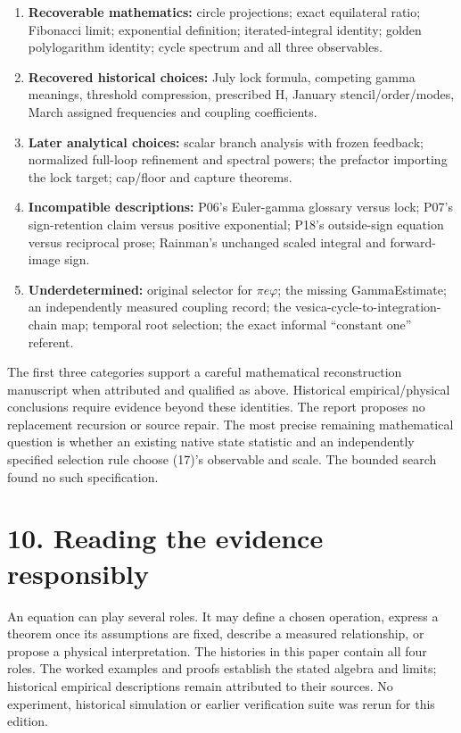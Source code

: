\documentclass[11pt,a4paper]{article}
\begin{document}
\begin{enumerate}
\item \textbf{Recoverable mathematics:} circle projections; exact equilateral ratio; Fibonacci limit; exponential definition; iterated-integral identity; golden polylogarithm identity; cycle spectrum and all three observables.
\item \textbf{Recovered historical choices:} July lock formula, competing gamma meanings, threshold compression, prescribed H, January stencil/order/modes, March assigned frequencies and coupling coefficients.
\item \textbf{Later analytical choices:} scalar branch analysis with frozen feedback; normalized full-loop refinement and spectral powers; the prefactor importing the lock target; cap/floor and capture theorems.
\item \textbf{Incompatible descriptions:} P06's Euler-gamma glossary versus lock; P07's sign-retention claim versus positive exponential; P18's outside-sign equation versus reciprocal prose; Rainman's unchanged scaled integral and forward-image sign.
\item \textbf{Underdetermined:} original selector for $\pi e\varphi$; the missing GammaEstimate; an independently measured coupling record; the vesica-cycle-to-integration-chain map; temporal root selection; the exact informal ``constant one'' referent.
\end{enumerate}

The first three categories support a careful mathematical reconstruction manuscript when attributed and qualified as above. Historical empirical/physical conclusions require evidence beyond these identities. The report proposes no replacement recursion or source repair. The most precise remaining mathematical question is whether an existing native state statistic and an independently specified selection rule choose (17)'s observable and scale. The bounded search found no such specification.




\clearpage
\section*{10. Reading the evidence responsibly}

An equation can play several roles. It may define a chosen operation, express a theorem once its assumptions are fixed, describe a measured relationship, or propose a physical interpretation. The histories in this paper contain all four roles. The worked examples and proofs establish the stated algebra and limits; historical empirical descriptions remain attributed to their sources. No experiment, historical simulation or earlier verification suite was rerun for this edition.
\end{document}
